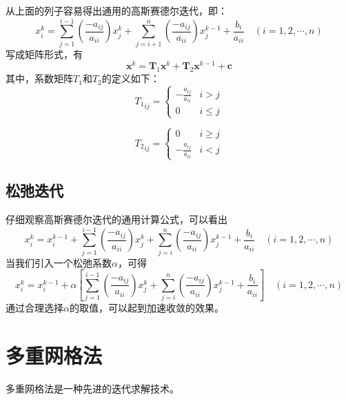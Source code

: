 从上面的列子容易得出通用的高斯赛德尔迭代，即：
\begin{equation}
  x_{i}^{k}
  =
  \sum_{j=1}^{i-1}
  \left(
    \frac{-a_{ij}}{a_{ii}}
  \right)
  x_{j}^{k}
  +
  \sum_{j=i+1}^{n}
  \left(
    \frac{-a_{ij}}{a_{ii}}
  \right)
  x_{j}^{k-1}
  +
  \frac{b_{i}}{a_{ii}}
  \quad
  (i=1,2,\cdots,n)
\end{equation}
写成矩阵形式，有
\begin{equation}
  \mathbf{x}^{k} 
  =
  \mathbf{T}_{1}\mathbf{x}^{k}
  +
  \mathbf{T}_{2}\mathbf{x}^{k-1}
  +
  \mathbf{c}
\end{equation}
其中，系数矩阵$T_{1}$和$T_{2}$的定义如下：
\begin{equation}
  {T_{1}}_{ij} 
  =
  \begin{cases}
    \displaystyle
    -\frac{a_{ij}}{a_{ii}} & i>j \\
    0 & i\le j
  \end{cases}
\end{equation}

\begin{equation}
  {T_{2}}_{ij} 
  =
  \begin{cases}
    0 & i\ge j
    \\
    \displaystyle
    -\frac{a_{ij}}{a_{ii}} & i<j 
  \end{cases}
\end{equation}

\subsection{松弛迭代}
仔细观察高斯赛德尔迭代的通用计算公式，可以看出
\begin{equation}
  x_{i}^{k}
  =
  x_{i}^{k-1}
  +
  \sum_{j=1}^{i-1}
  \left(
    \frac{-a_{ij}}{a_{ii}}
  \right)
  x_{j}^{k}
  +
  \sum_{j=i}^{n}
  \left(
    \frac{-a_{ij}}{a_{ii}}
  \right)
  x_{j}^{k-1}
  +
  \frac{b_{i}}{a_{ii}}
  \quad
  (i=1,2,\cdots,n)
\end{equation}
当我们引入一个松弛系数$\alpha$，可得
\begin{equation}
  x_{i}^{k}
  =
  x_{i}^{k-1}
  +
  \alpha
  \left[
  \sum_{j=1}^{i-1}
  \left(
    \frac{-a_{ij}}{a_{ii}}
  \right)
  x_{j}^{k}
  +
  \sum_{j=i}^{n}
  \left(
    \frac{-a_{ij}}{a_{ii}}
  \right)
  x_{j}^{k-1}
  +
  \frac{b_{i}}{a_{ii}}
    \right]
  \quad
  (i=1,2,\cdots,n)
\end{equation}
通过合理选择$\alpha$的取值，可以起到加速收敛的效果。

\section{多重网格法}
多重网格法是一种先进的迭代求解技术。
